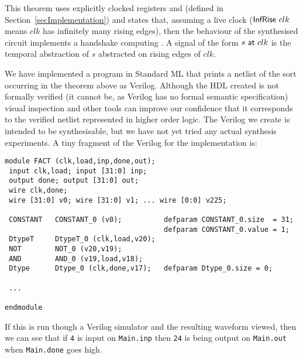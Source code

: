 \documentclass{llncs}
\begin{document}
This theorem uses explicitly clocked registers  and
 (defined in Section~\ref{secImplementation}) and states
that, assuming a live clock ($\mathsf{InfRise}~clk$ means $clk$
has infinitely many rising edges), then the behaviour of the
synthesised circuit implements a handshake computing
. A signal of the form $s~\mathsf{at}~clk$ is the temporal abstraction
of $s$ abstracted on rising edges of $clk$.

We have implemented a program in Standard ML that prints a netlist of
the sort occurring in the theorem above as Verilog. Although the HDL created is not
formally verified (it cannot be, as Verilog has no formal semantic
specification) visual inspection and other tools can improve our
confidence that it corresponds to the verified netlist
represented in higher order logic. The Verilog we create is intended
to be synthesisable, but we have not yet tried any actual synthesis
experiments. A tiny fragment of the Verilog for the 
implementation is:



{\footnotesize\baselineskip6pt\begin{verbatim}
module FACT (clk,load,inp,done,out);
 input clk,load; input [31:0] inp;
 output done; output [31:0] out;
 wire clk,done;
 wire [31:0] v0; wire [31:0] v1; ... wire [0:0] v225;

 CONSTANT   CONSTANT_0 (v0);          defparam CONSTANT_0.size  = 31;
                                      defparam CONSTANT_0.value = 1;
 DtypeT     DtypeT_0 (clk,load,v20);
 NOT        NOT_0 (v20,v19);
 AND        AND_0 (v19,load,v18);
 Dtype      Dtype_0 (clk,done,v17);   defparam Dtype_0.size = 0;

 ...

endmodule
\end{verbatim}}

\newpage

If this is run though a Verilog simulator and the
resulting waveform viewed, then we can see that if \texttt{4}
is input on \texttt{Main.inp} then \texttt{24} is
being output on \texttt{Main.out} when \texttt{Main.done} goes high.

\vspace*{5mm}


\mbox{}\hspace*{-5mm}
\end{document}
